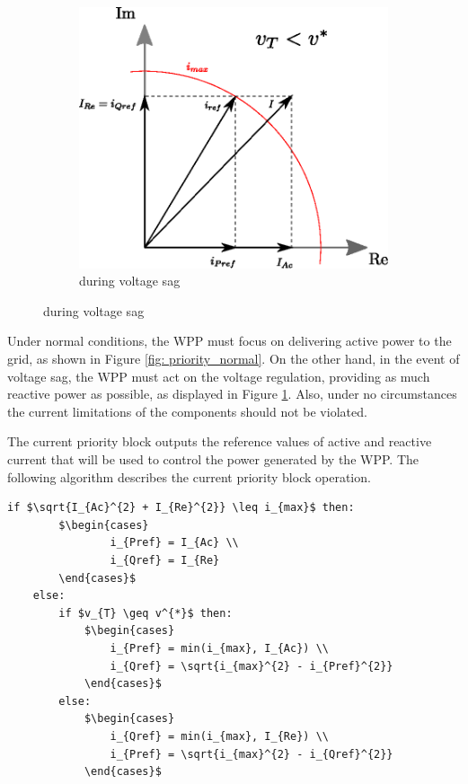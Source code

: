 \begin{figure}[b]
\begin{subfigure}[b]{0.4\textwidth}
    	\includegraphics[width=\textwidth]{Images/priority_block2.eps}
		\caption{during voltage sag}
		\label{fig: priority_sag}
	\end{subfigure}
	\label{fig: CurrentPriority}
\end{figure}

Under normal conditions, the WPP must focus on delivering active power to the grid, as shown in Figure \ref{fig: priority_normal}. On the other hand, in the event of voltage sag, the WPP must act on the voltage regulation, providing as much reactive power as possible, as displayed in Figure \ref{fig: priority_sag}. Also, under no circumstances the current limitations of the components should not be violated.

The current priority block outputs the reference values of active and reactive current that will be used to control the power generated by the WPP. The following algorithm describes the current priority block operation.

\begin{center}
	\begin{lstlisting}[mathescape, columns=fullflexible]
	if $\sqrt{I_{Ac}^{2} + I_{Re}^{2}} \leq i_{max}$ then:
		$\begin{cases}
				i_{Pref} = I_{Ac} \\
				i_{Qref} = I_{Re}
		\end{cases}$
	else:
		if $v_{T} \geq v^{*}$ then:	
			$\begin{cases}
				i_{Pref} = min(i_{max}, I_{Ac}) \\
				i_{Qref} = \sqrt{i_{max}^{2} - i_{Pref}^{2}}
			\end{cases}$
		else:
			$\begin{cases}
				i_{Qref} = min(i_{max}, I_{Re}) \\
				i_{Pref} = \sqrt{i_{max}^{2} - i_{Qref}^{2}}
			\end{cases}$
	\end{lstlisting}
\end{center}

